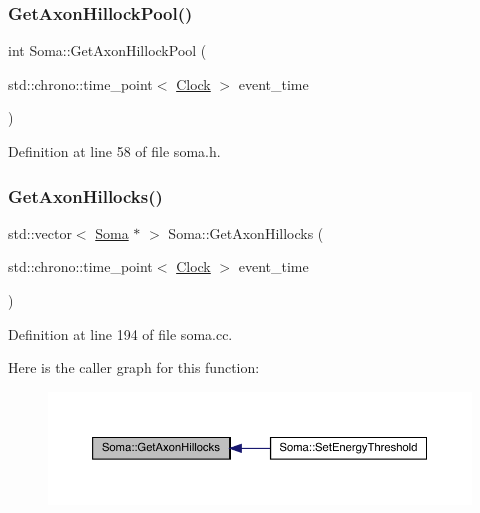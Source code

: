 \subsubsection{\texorpdfstring{Get\+Axon\+Hillock\+Pool()}{GetAxonHillockPool()}}
{\footnotesize\ttfamily int Soma\+::\+Get\+Axon\+Hillock\+Pool (\begin{DoxyParamCaption}\item[{std\+::chrono\+::time\+\_\+point$<$ \hyperlink{universe_8h_a0ef8d951d1ca5ab3cfaf7ab4c7a6fd80}{Clock} $>$}]{event\+\_\+time }\end{DoxyParamCaption})\hspace{0.3cm}{\ttfamily [inline]}}



Definition at line 58 of file soma.\+h.

\mbox{\label{class_soma_af76f86d082c3f60442148ec843b586e7}} 
\subsubsection{\texorpdfstring{Get\+Axon\+Hillocks()}{GetAxonHillocks()}}
{\footnotesize\ttfamily std\+::vector$<$ \hyperlink{class_soma}{Soma} $\ast$ $>$ Soma\+::\+Get\+Axon\+Hillocks (\begin{DoxyParamCaption}\item[{std\+::chrono\+::time\+\_\+point$<$ \hyperlink{universe_8h_a0ef8d951d1ca5ab3cfaf7ab4c7a6fd80}{Clock} $>$}]{event\+\_\+time }\end{DoxyParamCaption})}



Definition at line 194 of file soma.\+cc.

Here is the caller graph for this function\+:
\nopagebreak
\begin{figure}[H]
\begin{center}
\leavevmode
\includegraphics[width=350pt]{class_soma_af76f86d082c3f60442148ec843b586e7_icgraph}
\end{center}
\end{figure}
\mbox{\label{class_soma_a8bac091792e1ac47655bb549510e8960}} 
